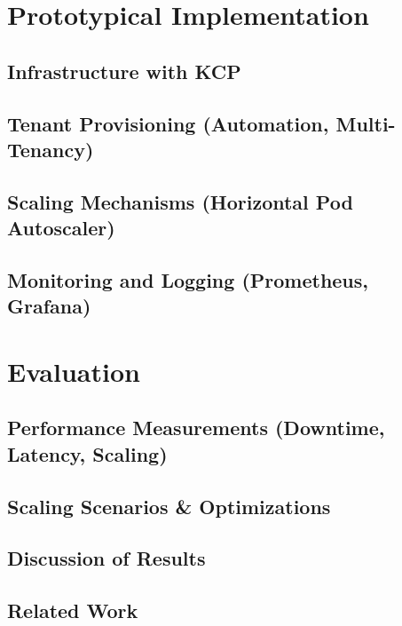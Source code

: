 \documentclass[11pt, a4paper, oneside, draft]{scrartcl}
\begin{document}
    \section{Prototypical Implementation}

        \subsection{Infrastructure with KCP}

        \subsection[Tenant Provisioning]{Tenant Provisioning (Automation, Multi-Tenancy)}

        \subsection[Scaling Mechanisms]{Scaling Mechanisms (Horizontal Pod Autoscaler)}

        \subsection[Monitoring and Logging]{Monitoring and Logging (Prometheus, Grafana)}

    \section{Evaluation}

        \subsection[Performance Measurements]{Performance Measurements (Downtime, Latency, Scaling)}

        \subsection{Scaling Scenarios \& Optimizations}

        \subsection{Discussion of Results}

        \subsection{Related Work}
\end{document}
